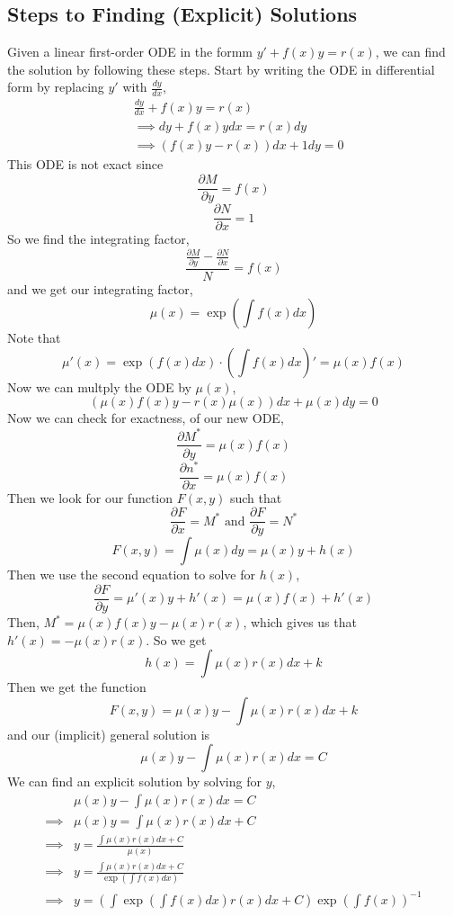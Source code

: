 \documentclass[openany]{report}
\begin{document}
\subsection{Steps to Finding (Explicit) Solutions}
Given a linear first-order ODE in the formm $y' + f(x)y = r(x)$, we can find the solution by following these steps. Start by writing the ODE in differential form by replacing $y'$ with $\frac{dy}{dx}$,
    \begin{align*}
        &\frac{dy}{dx} + f(x)y = r(x)\\
        &\implies dy + f(x)ydx = r(x)dy\\
        &\implies (f(x)y - r(x))dx + 1dy = 0  
    \end{align*}
    This ODE is not exact since 
    \[\frac{\partial M}{\partial y} = f(x)\]
    \[\frac{\partial N}{\partial x} = 1\]
    So we find the integrating factor,
    \[\frac{\frac{\partial M}{\partial y} - \frac{\partial N}{\partial x}}{N} = f(x)\]
    and we get our integrating factor, 
    \[\mu(x) = \exp\left(\int f(x)dx\right)\]
    Note that 
    \[\mu'(x) = \exp\left(f(x)dx\right)\cdot \left(\int f(x)dx\right)' = \mu(x) f(x)\]
    Now we can multply the ODE by $\mu(x)$,
    \[(\mu(x)f(x)y - r(x)\mu(x))dx + \mu(x)dy = 0\]
    Now we can check for exactness, of our new ODE, 
    \[\frac{\partial M^*}{\partial y} =\mu(x)f(x)\]
    \[\frac{\partial n^*}{\partial x} =\mu(x)f(x)\]
    Then we look for our function $F(x,y)$ such that
    \[\frac{\partial F}{\partial x} = M^* \text{ and } \frac{\partial F}{\partial y} = N^*\]
    \[F(x,y) = \int \mu(x) dy = \mu(x)y + h(x)\]
    Then we use the second equation to solve for $h(x)$,
    \[\frac{\partial F}{\partial y} = \mu'(x)y + h'(x) = \mu(x)f(x) + h'(x)\]
    Then, $M^* = \mu(x)f(x)y - \mu(x)r(x)$, which gives us that $h'(x) = - \mu(x)r(x)$. So we get
    \[h(x) = \int \mu(x)r(x)dx  + k \]
    Then we get the function 
    \[F(x,y) = \mu(x)y - \int \mu(x)r(x)dx + k\]
    and our (implicit) general solution is 
    \[\mu(x)y - \int\mu(x)r(x)dx = C\]
    We can find an explicit solution by solving for $y$, 
    \begin{align*}
        &\mu(x)y - \int\mu(x)r(x)dx = C\\
        \implies &\mu(x)y = \int\mu(x)r(x)dx + C\\
        \implies &y = \frac{\int\mu(x)r(x)dx + C}{\mu(x)}\\
        \implies &y = \frac{\int\mu(x)r(x)dx + C}{\exp\left(\int f(x)dx\right)}\\
        \implies &y = \left(\int \exp\left(\int f(x)dx\right)r(x)dx + C\right)\exp\left(\int f(x)\right)^{-1}
    \end{align*}
\end{document}
